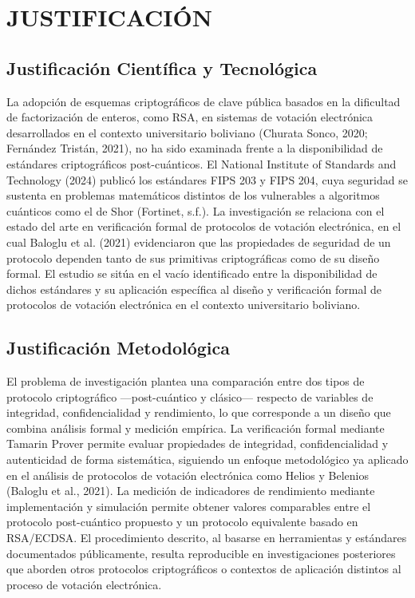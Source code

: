 \section{JUSTIFICACIÓN}

\subsection{Justificación Científica y Tecnológica}

La adopción de esquemas criptográficos de clave pública basados en la dificultad de factorización de enteros, como RSA, en sistemas de votación electrónica desarrollados en el contexto universitario boliviano (Churata Sonco, 2020; Fernández Tristán, 2021), no ha sido examinada frente a la disponibilidad de estándares criptográficos post-cuánticos. El National Institute of Standards and Technology (2024) publicó los estándares FIPS 203 y FIPS 204, cuya seguridad se sustenta en problemas matemáticos distintos de los vulnerables a algoritmos cuánticos como el de Shor (Fortinet, s.f.). La investigación se relaciona con el estado del arte en verificación formal de protocolos de votación electrónica, en el cual Baloglu et al. (2021) evidenciaron que las propiedades de seguridad de un protocolo dependen tanto de sus primitivas criptográficas como de su diseño formal. El estudio se sitúa en el vacío identificado entre la disponibilidad de dichos estándares y su aplicación específica al diseño y verificación formal de protocolos de votación electrónica en el contexto universitario boliviano.

\subsection{Justificación Metodológica}

El problema de investigación plantea una comparación entre dos tipos de protocolo criptográfico —post-cuántico y clásico— respecto de variables de integridad, confidencialidad y rendimiento, lo que corresponde a un diseño que combina análisis formal y medición empírica. La verificación formal mediante Tamarin Prover permite evaluar propiedades de integridad, confidencialidad y autenticidad de forma sistemática, siguiendo un enfoque metodológico ya aplicado en el análisis de protocolos de votación electrónica como Helios y Belenios (Baloglu et al., 2021). La medición de indicadores de rendimiento mediante implementación y simulación permite obtener valores comparables entre el protocolo post-cuántico propuesto y un protocolo equivalente basado en RSA/ECDSA. El procedimiento descrito, al basarse en herramientas y estándares documentados públicamente, resulta reproducible en investigaciones posteriores que aborden otros protocolos criptográficos o contextos de aplicación distintos al proceso de votación electrónica.

